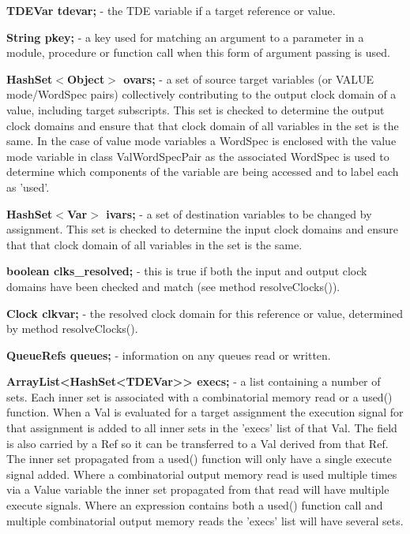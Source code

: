 \documentclass[10pt,a4paper,twoside,fleqn]{book}
\begin{document}
            {\bf TDEVar tdevar;} - the TDE variable if a target reference or
            value.
            
            {\bf String pkey;} - a key used for matching an argument to a
            parameter in a module, procedure or function call when this form
            of argument passing is used.

            {\bf HashSet$<$Object$>$ ovars;} - a set of source target variables
            (or VALUE mode/WordSpec pairs) collectively contributing to the output
            clock domain of a value, including target subscripts. This set is
            checked to determine the output clock domains and ensure that that
            clock domain of all variables in the set is the same. In the case
            of value mode variables a WordSpec is enclosed with the value mode
            variable in class ValWordSpecPair as the associated WordSpec is used
            to determine which components of the variable are being accessed and
            to label each as 'used'.
            
            {\bf HashSet$<$Var$>$ ivars;} - a set of destination variables to be
            changed by assignment. This set is checked to determine the input
            clock domains and ensure that that clock domain of all variables in
            the set is the same.
            
            {\bf boolean clks\_resolved;} - this is true if both the input and
            output clock domains have been checked and match (see method
            resolveClocks()).
            
            {\bf Clock clkvar;} - the resolved clock domain for this reference
            or value, determined by method resolveClocks().
            
            {\bf QueueRefs queues;} - information on any queues read or written.
            
            {\bf ArrayList<HashSet<TDEVar>> execs;} - a list containing a number
            of sets. Each inner set is associated with a combinatorial memory
            read or a used() function. When a Val is evaluated for a target
            assignment the execution signal for that assignment is added to all
            inner sets in the 'execs' list of that Val. The field is also
            carried by a Ref so it can be transferred to a Val derived from that
            Ref. The inner set propagated from a used() function will only have
            a single execute signal added. Where a combinatorial output memory
            read is used multiple times via a Value variable the inner set
            propagated from that read will have multiple execute signals. Where
            an expression contains both a used() function call and multiple
            combinatorial output memory reads the 'execs' list will have several
            sets.
\end{document}
